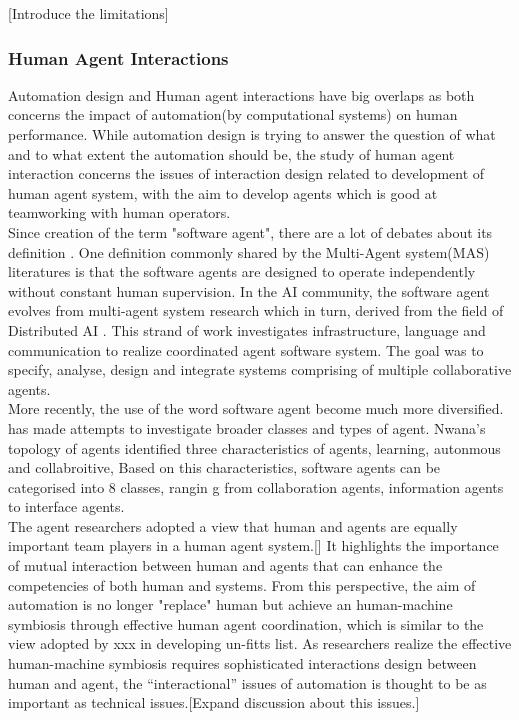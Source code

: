 [Introduce the limitations]


\subsubsection{Human Agent Interactions}
Automation design and Human agent interactions have big overlaps as both concerns the impact of automation(by computational systems) on human performance. While automation design is trying to answer the question of what and to what extent the automation should be, the study of human agent interaction concerns the issues of interaction design related to development of human agent system, with the aim to develop agents which is good at teamworking with human operators. \\

Since creation of the term "software agent", there are a lot of debates about its definition . One definition commonly shared by the Multi-Agent system(MAS) literatures is that the software agents are designed to operate independently without constant human supervision. In the AI community, the software agent evolves from multi-agent system research which in turn, derived from the field of Distributed AI \cite{Vlassis2007}. This strand of work investigates infrastructure, language and communication to realize coordinated agent software system. The goal was to specify, analyse, design and integrate systems comprising of multiple collaborative agents.\cite{Nwana1996} \\

More recently, the use of the word software agent become much more diversified. \cite{Nwana1996} has made attempts to investigate broader classes and types of agent. Nwana's \cite{Nwana1996} topology of agents identified three characteristics of agents, learning, autonmous and collabroitive, Based on this characteristics, software agents can be categorised into 8 classes, rangin g from collaboration agents, information agents to interface agents. \\

The agent researchers adopted a view that human and agents are equally important team players in a human agent system.[] It highlights the importance of mutual interaction between human and agents that can enhance the competencies of both human and systems. From this perspective, the aim of automation is no longer "replace" human but achieve an human-machine symbiosis through effective human agent coordination, which is similar to the view adopted by xxx in developing un-fitts list. As researchers realize the effective human-machine symbiosis requires sophisticated interactions design between human and agent, the ``interactional'' issues of automation is thought to be as important as technical issues.[Expand discussion about this issues.] \cite{Bradshaw2011}\\

